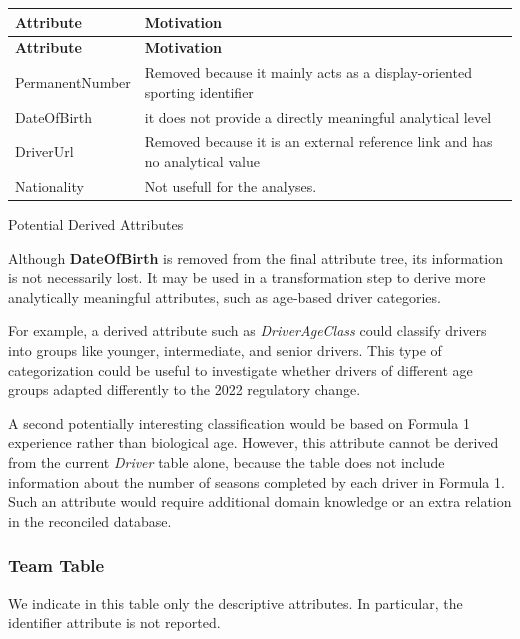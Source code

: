 \documentclass[a4paper,11pt]{article}
\begin{document}
	\begin{longtable}{|p{4.4cm}|p{10.8cm}|}
		\hline
		\textbf{Attribute} & \textbf{Motivation} \\
		\hline
		\endfirsthead
		
		\hline
		\textbf{Attribute} & \textbf{Motivation} \\
		\hline
		\endhead
		
		PermanentNumber & Removed because it mainly acts as a display-oriented sporting identifier  \\ \hline
		
		
		DateOfBirth & it does not provide a directly meaningful analytical level \\ \hline
		
		DriverUrl & Removed because it is an external reference link and has no analytical value \\ \hline
		
	    Nationality & Not usefull for the analyses. \\ \hline
		
		
	\end{longtable}
	
	Potential Derived Attributes
	
	Although \textbf{DateOfBirth} is removed from the final attribute tree, its information is not necessarily lost. It may be used in a transformation step to derive more analytically meaningful attributes, such as age-based driver categories.
	
	For example, a derived attribute such as \textit{DriverAgeClass} could classify drivers into groups like younger, intermediate, and senior drivers. This type of categorization could be useful to investigate whether drivers of different age groups adapted differently to the 2022 regulatory change.
	
	A second potentially interesting classification would be based on Formula 1 experience rather than biological age. However, this attribute cannot be derived from the current \textit{Driver} table alone, because the table does not include information about the number of seasons completed by each driver in Formula 1. Such an attribute would require additional domain knowledge or an extra relation in the reconciled database.
	
	\subsubsection{Team Table}
	
	We indicate in this table only the descriptive attributes. In particular, the identifier attribute is not reported.
	
\end{document}

